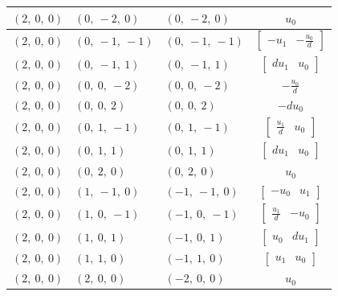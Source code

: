 \documentclass[11pt]{article}
\theoremstyle{definition}
\begin{document}
\begin{longtable}{|l|l|l|c|}
    \hline
    $\left( 2, \  0, \  0\right)$ & $\left( 0, \  -2, \  0\right)$ & $\left( 0, \  -2, \  0\right)$ & $u_{0}$ \\
    \hline
    $\left( 2, \  0, \  0\right)$ & $\left( 0, \  -1, \  -1\right)$ & $\left( 0, \  -1, \  -1\right)$ & $\left[\begin{matrix}- u_{1} & - \frac{u_{0}}{d}\end{matrix}\right]$ \\
    \hline
    $\left( 2, \  0, \  0\right)$ & $\left( 0, \  -1, \  1\right)$ & $\left( 0, \  -1, \  1\right)$ & $\left[\begin{matrix}d u_{1} & u_{0}\end{matrix}\right]$ \\
    \hline
    $\left( 2, \  0, \  0\right)$ & $\left( 0, \  0, \  -2\right)$ & $\left( 0, \  0, \  -2\right)$ & $- \frac{u_{0}}{d}$ \\
    \hline
    $\left( 2, \  0, \  0\right)$ & $\left( 0, \  0, \  2\right)$ & $\left( 0, \  0, \  2\right)$ & $- d u_{0}$ \\
    \hline
    $\left( 2, \  0, \  0\right)$ & $\left( 0, \  1, \  -1\right)$ & $\left( 0, \  1, \  -1\right)$ & $\left[\begin{matrix}\frac{u_{1}}{d} & u_{0}\end{matrix}\right]$ \\
    \hline
    $\left( 2, \  0, \  0\right)$ & $\left( 0, \  1, \  1\right)$ & $\left( 0, \  1, \  1\right)$ & $\left[\begin{matrix}d u_{1} & u_{0}\end{matrix}\right]$ \\
    \hline
    $\left( 2, \  0, \  0\right)$ & $\left( 0, \  2, \  0\right)$ & $\left( 0, \  2, \  0\right)$ & $u_{0}$ \\
    \hline
    $\left( 2, \  0, \  0\right)$ & $\left( 1, \  -1, \  0\right)$ & $\left( -1, \  -1, \  0\right)$ & $\left[\begin{matrix}- u_{0} & u_{1}\end{matrix}\right]$ \\
    \hline
    $\left( 2, \  0, \  0\right)$ & $\left( 1, \  0, \  -1\right)$ & $\left( -1, \  0, \  -1\right)$ & $\left[\begin{matrix}\frac{u_{1}}{d} & - u_{0}\end{matrix}\right]$ \\
    \hline
    $\left( 2, \  0, \  0\right)$ & $\left( 1, \  0, \  1\right)$ & $\left( -1, \  0, \  1\right)$ & $\left[\begin{matrix}u_{0} & d u_{1}\end{matrix}\right]$ \\
    \hline
    $\left( 2, \  0, \  0\right)$ & $\left( 1, \  1, \  0\right)$ & $\left( -1, \  1, \  0\right)$ & $\left[\begin{matrix}u_{1} & u_{0}\end{matrix}\right]$ \\
    \hline
    $\left( 2, \  0, \  0\right)$ & $\left( 2, \  0, \  0\right)$ & $\left( -2, \  0, \  0\right)$ & $u_{0}$ \\
    \hline
\end{longtable}
\end{document}
